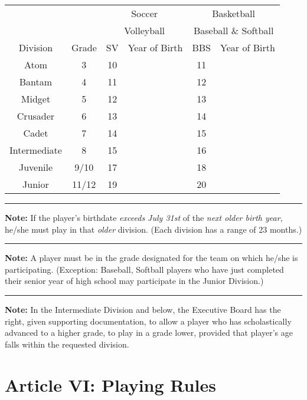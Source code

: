 \begin{center}
    \begin{tabular}{|c|c|c|c|c|c|}
        \hline
         & & \multicolumn{2}{c|}{Soccer} & \multicolumn{2}{c|}{Basketball} \\
         & & \multicolumn{2}{c|}{Volleyball} & \multicolumn{2}{c|}{Baseball \& Softball} \\
         \hline
         Division & Grade & SV & Year of Birth & BBS & Year of Birth \\
         \hline
         Atom & 3 & 10 & & 11 & \\
         \hline
         Bantam & 4 & 11 & & 12 & \\
         \hline
         Midget & 5 & 12 & & 13 & \\
         \hline
         Crusader & 6 & 13 & & 14 & \\
         \hline
         Cadet & 7 & 14 & & 15 & \\
         \hline
         Intermediate & 8 & 15 & & 16 & \\
         \hline
         Juvenile & 9/10 & 17 & & 18 & \\
         \hline
         Junior & 11/12 & 19 & & 20 & \\
         \hline
    \end{tabular}
\end{center}
\plainbreak{1}
\textbf{Note:}  If the player’s birthdate {\em exceeds July 31st} of the {\em next older birth year,} he/she must play in that {\em older} division. (Each division has a range of 23 months.)
\plainbreak{1}
\textbf{Note:}  A player must be in the grade designated for the team on which he/she is participating.  (Exception: Baseball, Softball players who have just completed their senior year of high school may participate in the Junior Division.)
\plainbreak{1}
\textbf{Note:} In the Intermediate Division and below, the Executive Board has the right, given supporting documentation, to allow a player who has scholastically advanced to a higher grade, to play in a grade lower, provided that player’s age falls within the requested division.

\section{Article VI: Playing Rules}
\label{sec:const-6}
